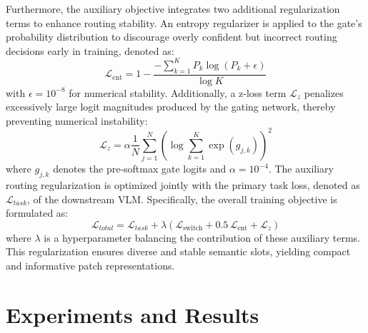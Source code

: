 \documentclass[runningheads]{llncs}
\begin{document}
Furthermore, the auxiliary objective integrates two additional regularization terms to enhance routing stability. An entropy regularizer is applied to the gate's probability distribution to discourage overly confident but incorrect routing decisions early in training, denoted as:
\begin{equation}
\mathcal{L}_{\text{ent}}
= 1 - 
\frac{
- \sum_{k=1}^{K} P_k \log (P_k + \epsilon)
}{
\log K
}
\end{equation}
with $\epsilon = 10^{-8}$ for numerical stability. Additionally, a z-loss term $\mathcal{L}_{z}$ penalizes excessively large logit magnitudes produced by the gating network, thereby preventing numerical instability:
\begin{equation}
\mathcal{L}_{z} = \alpha \frac{1}{N} \sum_{j=1}^{N} \left( \log \sum_{k=1}^{K} \exp(g_{j,k}) \right)^2
\end{equation}
where $g_{j,k}$ denotes the pre-softmax gate logits and $\alpha = 10^{-4}$. The auxiliary routing regularization is optimized jointly with the primary task loss, denoted as $\mathcal{L}_{task}$, of the downstream VLM. Specifically, the overall training objective is formulated as:
\begin{equation}
    \mathcal{L}_{total} = \mathcal{L}_{task} + \lambda (\mathcal{L}_{\text{switch}} + 0.5\,\mathcal{L}_{\text{ent}} + \mathcal{L}_{z})
\end{equation}
 where $\lambda$ is a hyperparameter balancing the contribution of these auxiliary terms. This regularization ensures diverse and stable semantic slots, yielding compact and informative patch representations.


\section{Experiments and Results}
\label{sec:experiments}
\end{document}
